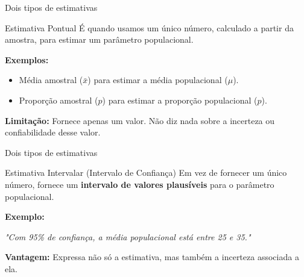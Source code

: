 \documentclass[14pt,aspectratio=1610]{beamer}
\begin{document}
	\begin{frame}{Dois tipos de estimativas}
		
		\begin{block}{Estimativa Pontual}
			\justifying
			É quando usamos um único número, calculado a partir da amostra, para estimar um parâmetro populacional.
			
			\vspace{0.2cm}
			\textbf{Exemplos:}
			\begin{itemize}
				\item Média amostral (\( \bar{x} \)) para estimar a média populacional (\( \mu \)).
				\item Proporção amostral (\( \hat{p} \)) para estimar a proporção populacional (\( p \)).
			\end{itemize}
			
			\textbf{Limitação:} Fornece apenas um valor. Não diz nada sobre a incerteza ou confiabilidade desse valor.
		\end{block}
		
	\end{frame}
	
	\begin{frame}{Dois tipos de estimativas}
			
		\begin{block}{Estimativa Intervalar (Intervalo de Confiança)}
			\justifying
			Em vez de fornecer um único número, fornece um \textbf{intervalo de valores plausíveis} para o parâmetro populacional.
			
			\vspace{0.2cm}
			\textbf{Exemplo:}
			\begin{center}
				\textit{"Com 95\% de confiança, a média populacional está entre 25 e 35."}
			\end{center}
			
			\textbf{Vantagem:} Expressa não só a estimativa, mas também a incerteza associada a ela.
		\end{block}
		
	\end{frame}
	
\end{document}
